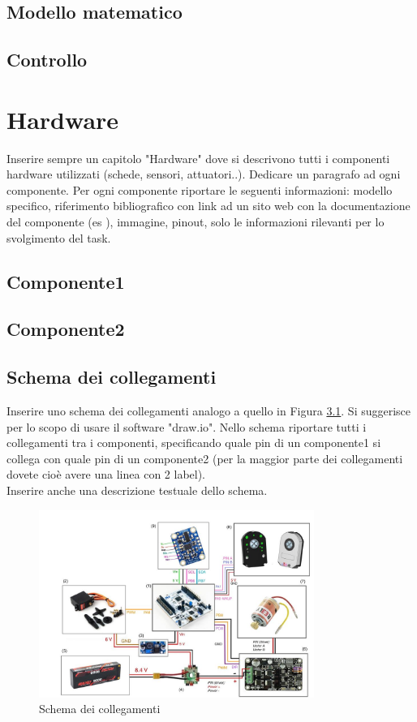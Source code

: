 \documentclass[11pt]{report}
\begin{document}
\section{Modello matematico}
\section{Controllo}

\newpage
\chapter{Hardware}
\label{Hardware}
Inserire sempre un capitolo "Hardware" dove si descrivono tutti i componenti hardware utilizzati (schede, sensori, attuatori..). Dedicare un paragrafo ad ogni componente. Per ogni componente riportare le seguenti informazioni: modello specifico, riferimento bibliografico con link ad un sito web con la documentazione del componente (es \cite{DCdriver}), immagine, pinout, solo le informazioni rilevanti per lo svolgimento del task.
\section{Componente1}
\section{Componente2}
\section{Schema dei collegamenti}
Inserire uno schema dei collegamenti analogo a quello in Figura \ref{fig:schema}. Si suggerisce per lo scopo di usare il software "draw.io". Nello schema riportare tutti i collegamenti tra i componenti, specificando quale pin di un componente1 si collega con quale pin di un componente2 (per la maggior parte dei collegamenti dovete cioè avere una linea con 2 label). \\
Inserire anche una descrizione testuale dello schema.

\begin{figure}[H]
\centering
\includegraphics[width=0.8\textwidth,keepaspectratio]{figures/Schema.JPG}
\caption{Schema dei collegamenti}
\label{fig:schema}
\end{figure}
\end{document}
